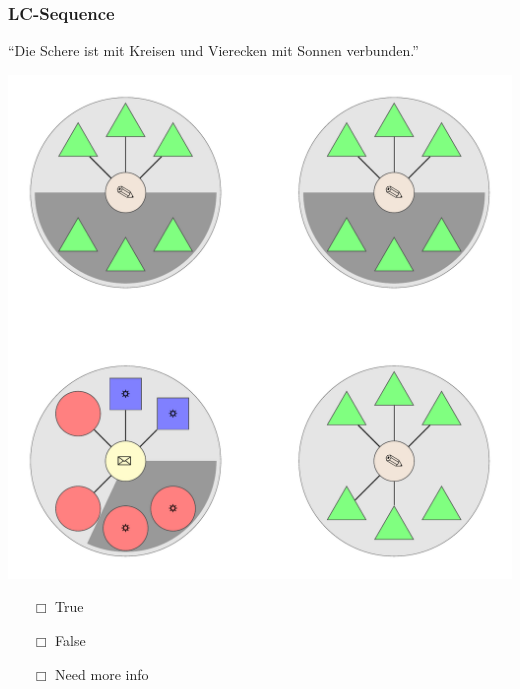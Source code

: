 \documentclass[fleqn,10pt,serif,xcolor=dvipsnames]{beamer}
\newcommand{\LC}{LC\xspace}
\newcommand{\mymark}[1]{{\color{blue}{#1}}}
\begin{document}
\begin{frame}
  \frametitle{\LC-Sequence}
  \begin{center}
    ``Die Schere ist mit Kreisen und Vierecken mit Sonnen verbunden.''

    \vspace{0.1cm}

    \includegraphics[width=0.5 \textwidth]{../../pictures/lc_01_5.pdf}

    \vspace{0.1cm}

    \begin{multicols}{3}
      \begin{itemize} 
      \item[$\Box$] True\\
        \onslide<2>{$\leadsto$  \mymark{false}}
      \item[$\Box$] False\\
        \onslide<2>{$\leadsto$ \mymark{false}}
      \item[$\Box$] Need more info 
      \end{itemize}
    \end{multicols}

  \end{center}
\end{frame}
\end{document}
